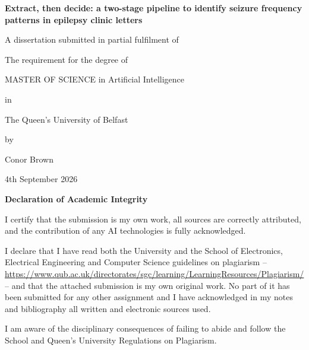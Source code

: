 \documentclass[conference]{IEEEtran}
\begin{document}
\begin{titlepage}
    \centering

    {\Huge\bfseries Extract, then decide: a two-stage pipeline to identify seizure frequency patterns in epilepsy clinic letters \par}
    \vspace{5cm}

    {\large
    A dissertation submitted in partial fulfilment of\par
    The requirement for the degree of\par
    MASTER OF SCIENCE in Artificial Intelligence\par
    in\par
    \par
    The Queen’s University of Belfast\par
    by\par
    Conor Brown\par
    4th September 2026
    }
\end{titlepage}

\onecolumn
\thispagestyle{empty}

\begin{center}
{\Large\bfseries Declaration of Academic Integrity}
\end{center}

\vspace{8pt}

\noindent
I certify that the submission is my own work, all sources are
correctly attributed, and the contribution of any AI technologies
is fully acknowledged.

\vspace{6pt}

\noindent
I declare that I have read both the University and the School of
Electronics, Electrical Engineering and Computer Science guidelines
on plagiarism --
\url{https://www.qub.ac.uk/directorates/sgc/learning/LearningResources/Plagiarism/}
-- and that the attached submission is my own original work. No part
of it has been submitted for any other assignment and I have
acknowledged in my notes and bibliography all written and electronic
sources used.

\vspace{6pt}

\noindent
I am aware of the disciplinary consequences of failing to abide and
follow the School and Queen's University Regulations on Plagiarism.

\vspace{18pt}
\end{document}
